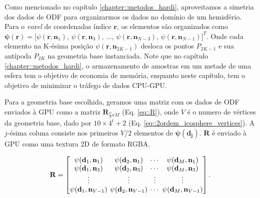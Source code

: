 Como mencionado no capítulo \ref{chapter::metodos_hardi}, aproveitamos a simetria dos dados de ODF para organizarmos os dados no domínio de um hemisfério. Para o \textit{voxel} de coordenadas índice $\mathbf{r}$, os elementos são organizados como $\boldsymbol{\psi}(\mathbf{r}) = [
\psi(\mathbf{r}, \mathbf{n}_1)    $,
$\psi(\mathbf{r}, \mathbf{n}_3)    $, ...,
$\psi(\mathbf{r}, \mathbf{n}_{N-3})$,
$\psi(\mathbf{r}, \mathbf{n}_{N-1})
]^T$. Onde cada elemento na K-ésima posição $\psi(\mathbf{r}, \mathbf{n}_{2K-1})$ desloca os pontos $P_{2K-1}$ e sua antípoda $P_{2K}$ na geometria base instanciada. Note que no capítulo \ref{chapter::metodos_hardi}, o armazenamento de amostras em um metade de uma esfera tem o objetivo de economia de memória, enquanto neste capítulo, tem o objetivo de minimizar o tráfego de dados CPU-GPU.

Para a geometria base escolhida, geramos uma matriz com os dados de ODF enviados à GPU como a matriz $\mathbf{R}_{\frac{V}{2}xM}$ (Eq. \ref{eq::R}), onde $V$ é o numero de vértices da geometria base, dado por $10 \times 4^t + 2$ (Eq. \ref{eq::2ordem_icosphere_vertices}). A $j$-ésima coluna consiste nos primeiros $V/2$ elementos de $\boldsymbol{\psi}(\mathbf{d_j})$. $\mathbf{R}$ é enviado à GPU como uma textura 2D de formato RGBA.

\begin{equation}
\label{eq::R}
\mathbf{R} = 
\begingroup %
\setlength\arraycolsep{2pt}
\begin{bmatrix} 
    \psi(\mathbf{d}_{1}, \mathbf{n}_1) &
    \psi(\mathbf{d}_{2}, \mathbf{n}_1) & \cdots & 
    \psi(\mathbf{d}_{M}, \mathbf{n}_1)  \\
    
    \psi(\mathbf{d}_{1}, \mathbf{n}_3) &
    \psi(\mathbf{d}_{2}, \mathbf{n}_3) & \cdots & 
    \psi(\mathbf{d}_{M}, \mathbf{n}_{3}) \\ \vdots & \vdots & \vdots & \vdots  \\
    
    \psi(\mathbf{d}_{1}, \mathbf{n}_{V-1}) & 
    \psi(\mathbf{d}_{2}, \mathbf{n}_{V-1}) & \cdots & 
    \psi(\mathbf{d}_{M}, \mathbf{n}_{V-1})
\end{bmatrix}.
\endgroup
\end{equation}

